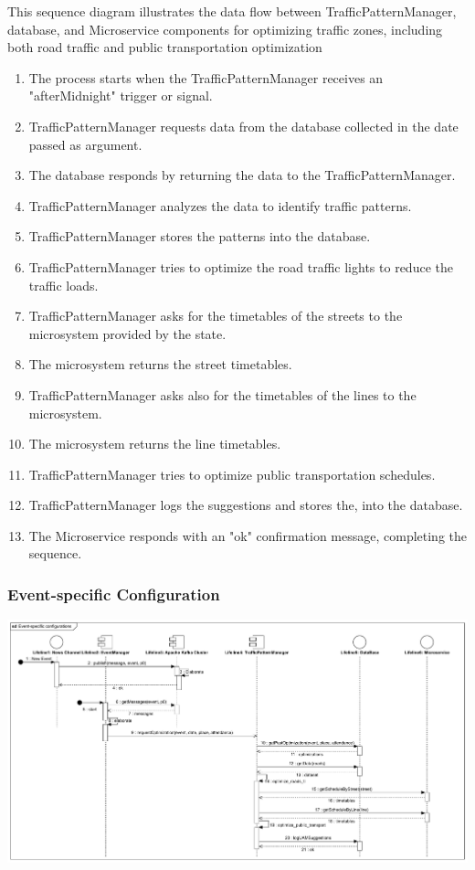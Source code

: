 \documentclass[12pt, a4paper, twoside, openright]{report}
\begin{document}
This sequence diagram illustrates the data flow between TrafficPatternManager, database, and Microservice components for optimizing traffic zones, including both road traffic and public transportation optimization
\begin{enumerate}
  \item The process starts when the TrafficPatternManager receives an "afterMidnight" trigger or signal.
  \item TrafficPatternManager requests data from the database collected in the date passed as argument.
  \item The database responds by returning the data to the TrafficPatternManager.
  \item TrafficPatternManager analyzes the data to identify traffic patterns.
  \item TrafficPatternManager stores the patterns into the database.
  \item TrafficPatternManager tries to optimize the road traffic lights to reduce the traffic loads.
  \item	TrafficPatternManager asks for the timetables of the streets to the microsystem provided by the state.
  \item	The microsystem returns the street timetables.
  \item	TrafficPatternManager asks also for the timetables of the lines to the microsystem.
  \item	The microsystem returns the line timetables.
  \item TrafficPatternManager tries to optimize public transportation schedules.
  \item TrafficPatternManager logs the suggestions and stores the, into the database.
  \item The Microservice responds with an "ok" confirmation message, completing the sequence.
\end{enumerate}

\subsubsection{Event-specific Configuration}


\includegraphics[width=\linewidth]{images/svg/event-specific_configurations.pdf}
\end{document}
